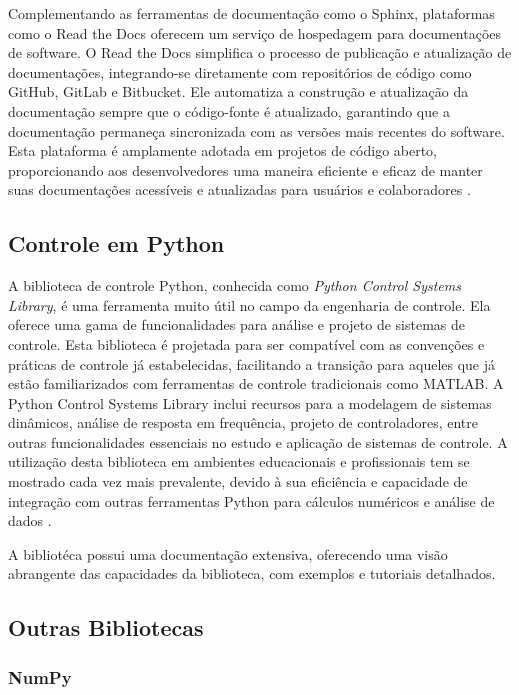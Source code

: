 Complementando as ferramentas de documentação como o Sphinx, plataformas como o Read the Docs oferecem um serviço de
hospedagem para documentações de software.
O Read the Docs simplifica o processo de publicação e atualização de documentações, integrando-se diretamente com
repositórios de código como GitHub, GitLab e Bitbucket.
Ele automatiza a construção e atualização da documentação sempre que o código-fonte é atualizado, garantindo que a
documentação permaneça sincronizada com as versões mais recentes do software.
Esta plataforma é amplamente adotada em projetos de código aberto, proporcionando aos desenvolvedores uma maneira
eficiente e eficaz de manter suas documentações acessíveis e atualizadas para usuários e colaboradores \cite{rtd}.

\subsection{Controle em Python}

A biblioteca de controle Python, conhecida como \textit{Python Control Systems Library}, é uma ferramenta muito útil no campo da
engenharia de controle.
Ela oferece uma gama de funcionalidades para análise e projeto de sistemas de controle.
Esta biblioteca é projetada para ser compatível com as convenções e práticas de controle já estabelecidas, facilitando
a transição para aqueles que já estão familiarizados com ferramentas de controle tradicionais como MATLAB.
A Python Control Systems Library inclui recursos para a modelagem de sistemas dinâmicos, análise de resposta em
frequência, projeto de controladores, entre outras funcionalidades essenciais no estudo e aplicação de sistemas de
controle.
A utilização desta biblioteca em ambientes educacionais e profissionais tem se mostrado cada vez mais prevalente,
devido à sua eficiência e capacidade de integração com outras ferramentas Python para cálculos numéricos e análise de
dados \cite{ctrlib}.

A bibliotéca possui uma documentação extensiva, oferecendo uma visão abrangente das capacidades da biblioteca,
com exemplos e tutoriais detalhados.

\subsection{Outras Bibliotecas}

\subsubsection{NumPy}

